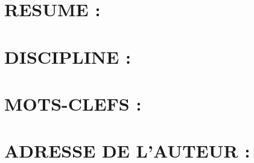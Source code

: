 \newpage

\section*{RESUME :}
\vfill
\newpage

\section*{DISCIPLINE :}
\vfill
\newpage

\section*{MOTS-CLEFS :}
\vfill
\newpage

\section*{ADRESSE DE L'AUTEUR :}
\vfill
